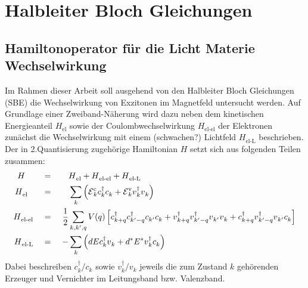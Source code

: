 \documentclass[a4paper,11pt]{article}
\newcommand{\ind}[2]{{_{#1}^{#2}}}
\newcommand{\+}{\dagger}
\newcommand{\E}{\mathcal{E}}
\renewcommand{\^}{\hat}
\renewcommand{\tt}{\text}
\renewcommand{\~}{\widetilde}
\begin{document}
\section{Halbleiter Bloch Gleichungen}
\subsection{Hamiltonoperator für die Licht Materie Wechselwirkung}
Im Rahmen dieser Arbeit soll ausgehend von den Halbleiter Bloch Gleichungen (SBE) die Wechselwirkung von Exzitonen im Magnetfeld untersucht werden. Auf Grundlage einer Zweiband-Näherung wird dazu neben dem kinetischen Energieanteil $H\ind{\tt{el}}{}$ sowie der Coulombwechselwirkung $H\ind{\tt{el-el}}{}$ der Elektronen zunächst die Wechselwirkung mit einem (schwachen?) Lichtfeld $H\ind{\tt{el-L}}{}$ beschrieben. Der in 2.Quantisierung zugehörige Hamiltonian $H$ setzt sich aus folgenden Teilen zusammen: 
\begin{alignat*}{3}
H \quad  				&&\ = \ && &H\ind{\tt{el}}{} +H\ind{\tt {el-el}}{}+H\ind{\tt {el-L}}{} \\
H\ind{\tt{el}}{} 	\ \	&&\ = \ && &\sum_k\left (			\E \ind{k}{\tt c} c\ind{k}{\+}c\ind{k}{} +\E \ind{k}{\tt {v}}v\ind{k}{\+}v\ind{k}{}    	\right ) \\
H\ind{\tt {el-el}}{} &&\ = \ &&\frac{1}{2}&\sum_{k,k',q} V(q)\left [			c\ind{k+q}{\+} c\ind{k'-q}{\+}c\ind{k'}{}c\ind{k}{} +v\ind{k+q}{\+}v\ind{k'-q}{\+}v\ind{k'}{}v\ind{k}{}   +  	 	c\ind{k+q}{\+}v\ind{k'-q}{\+}v\ind{k'}{}c\ind{k}{}    	\right ] \\
H\ind{\tt {el-L}}{} 	&&\ = \ && -&\sum_{k} \left (dE c\ind{k}{\+}v\ind{k}{} + d^*E^*v\ind{k}{\+}c\ind{k}{}\right ) 
\end{alignat*}
Dabei beschreiben $c\ind{k}{\+}/c\ind{k}{}$ sowie $v\ind{k}{\+}/v\ind{k}{}$ jeweils die zum Zustand $k$ gehörenden Erzeuger und Vernichter im Leitungsband bzw. Valenzband. 
\end{document}
